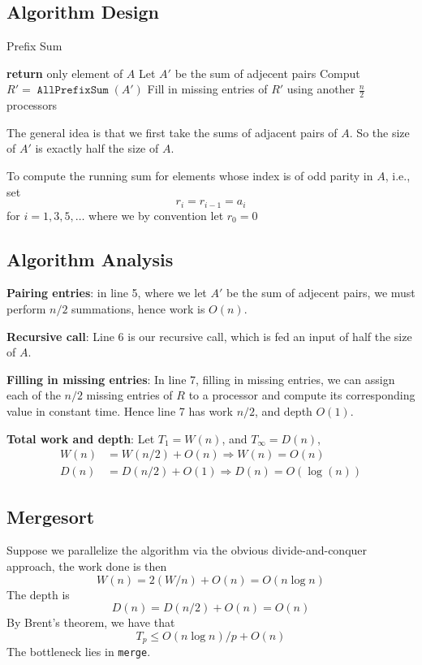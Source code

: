 \documentclass[11pt]{article}
\DeclareMathOperator{\AllPrefixSum}{\texttt{AllPrefixSum}}
\begin{document}
\subsection{Algorithm Design}
\label{sec:org27a668f}
\begin{algorithm}
\caption{Prefix Sum}
\begin{algorithmic}[1]
    \State \textbf{return} only element of \(A\)
\EndIf
\State Let \(A'\) be the sum of adjecent pairs
\State Comput \(R'=\AllPrefixSum(A')\)
\State Fill in missing entries of \(R'\) using another \(\frac{n}{2}\) processors
\end{algorithmic}
\end{algorithm}

The general idea is that we first take the sums of adjacent pairs of \(A\). So the size
of \(A'\) is exactly half the size of \(A\).

To compute the running sum for elements whose index is of odd parity in \(A\), i.e., set
\begin{equation*}
r_i=r_{i-1}=a_i
\end{equation*}
for \(i=1,3,5,\dots\) where we by convention let \(r_0=0\)
\subsection{Algorithm Analysis}
\label{sec:orgea1b28f}
\textbf{Pairing entries}: in line 5, where we let \(A'\) be the sum of adjecent pairs, we must
perform \(n/2\) summations, hence work is \(O(n)\).

\textbf{Recursive call}: Line 6 is our recursive call, which is fed an input of half the size of \(A\).

\textbf{Filling in missing entries}: In line 7, filling in missing entries, we can assign each of
 the \(n/2\) missing entries of \(R\) to a processor and compute its corresponding value in
 constant time. Hence line 7 has work \(n/2\), and depth \(O(1)\).

\textbf{Total work and depth}: Let \(T_1=W(n)\), and \(T_\infty=D(n)\),
 \begin{align*}
W(n)&=W(n/2)+O(n)\Rightarrow W(n)=O(n)\\
D(n)&=D(n/2)+O(1)\Rightarrow D(n)=O(\log(n))
 \end{align*}
\subsection{Mergesort}
\label{sec:orgab84b8d}
Suppose we parallelize the algorithm via the obvious divide-and-conquer approach, the work done
is then
\begin{equation*}
W(n)=2(W/n)+O(n)=O(n\log n)
\end{equation*}
The depth is
\begin{equation*}
D(n)=D(n/2)+O(n)=O(n)
\end{equation*}
By Brent's theorem, we have that
\begin{equation*}
T_p\le O(n\log n)/p+O(n)
\end{equation*}
The bottleneck lies in \texttt{merge}.
\end{document}

